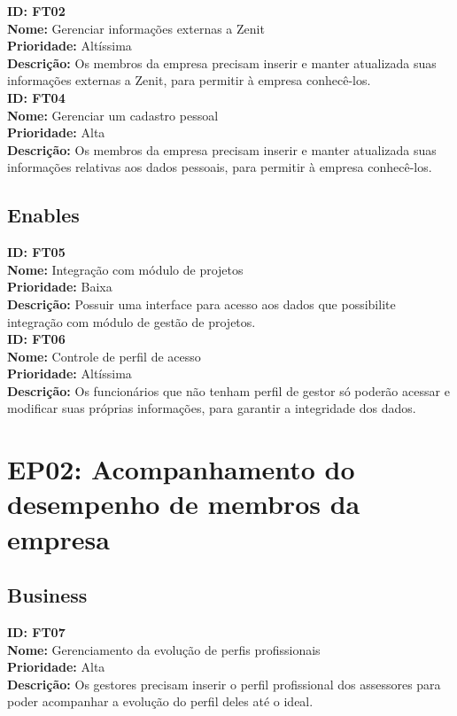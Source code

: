 \begin{anexosenv}
\textbf{ID: FT02 \\
Nome:} Gerenciar informações externas a Zenit\\
\textbf{Prioridade:} Altíssima\\
\textbf{Descrição:} Os membros da empresa precisam inserir e manter atualizada suas informações externas a Zenit, para permitir à empresa conhecê-los.\\

\textbf{ID: FT04 \\
Nome:} Gerenciar um cadastro pessoal\\
\textbf{Prioridade:} Alta\\
\textbf{Descrição:} Os membros da empresa precisam inserir e manter atualizada suas informações relativas aos dados pessoais, para permitir à empresa conhecê-los.\\

\subsection[Enables]{Enables}

\textbf{ID: FT05\\
Nome:} Integração com módulo de projetos\\
\textbf{Prioridade:} Baixa\\
\textbf{Descrição:} Possuir uma interface para acesso aos dados que possibilite integração com módulo de gestão de projetos.\\

\textbf{ID: FT06\\
Nome:} Controle de perfil de acesso\\
\textbf{Prioridade:} Altíssima\\
\textbf{Descrição:} Os funcionários que não tenham perfil de gestor só poderão acessar e modificar suas próprias informações, para garantir a integridade dos dados.\\

\section[EP02: Acompanhamento do desempenho de membros da empresa]{EP02: Acompanhamento do desempenho de membros da empresa}

\subsection[Business]{Business}

\textbf{ID: FT07}\\
\textbf{Nome:} Gerenciamento da evolução de perfis profissionais\\
\textbf{Prioridade:} Alta\\
\textbf{Descrição:} Os gestores precisam inserir o perfil profissional dos assessores para poder acompanhar a evolução do perfil deles até o ideal.\\


\end{anexosenv}
